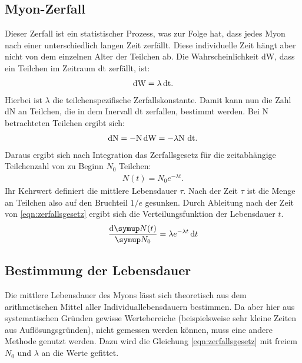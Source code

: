 \subsection{Myon-Zerfall}

Dieser Zerfall ist ein statistischer Prozess, was zur Folge hat, dass jedes Myon nach einer unterschiedlich langen Zeit zerfällt. Diese individuelle Zeit hängt aber nicht von dem einzelnen Alter der Teilchen ab.
Die Wahrscheinlichkeit dW, dass ein Teilchen im Zeitraum dt zerfällt, ist:
\begin{align}
  \mathop{}\!\mathrm{d} \text{W} = \lambda \mathop{}\!\mathrm{d} \text{t}.
\end{align}
Hierbei ist $\lambda$ die teilchenspezifische Zerfallskonstante.
Damit kann nun die Zahl dN an Teilchen, die in dem Inervall dt zerfallen, bestimmt werden. Bei N betrachteten Teilchen ergibt sich:
\begin{align}
  \mathop{}\!\mathrm{d} \text{N} = - \text{N} \mathop{}\!\mathrm{d} \text{W} = - \lambda \text{N dt}.
\end{align}
Daraus ergibt sich nach Integration das Zerfallsgesetz für
die zeitabhängige Teilchenzahl von zu Beginn $N_0$ Teilchen:
\begin{align}
  N(t) = N_0 e^{-\lambda t}. \label{eqn:zerfallsgesetz}
\end{align}
Ihr Kehrwert definiert die mittlere Lebensdauer $\tau$. Nach der Zeit $\tau$ ist die Menge an Teilchen also auf den Bruchteil $1/e$ gesunken.
Durch Ableitung nach der Zeit von \eqref{eqn:zerfallsgesetz} ergibt sich die Verteilungsfunktion der Lebensdauer $t$.
\begin{align}
  \frac{\dif \g{N}(t)}{\g{N}_0} = \lambda e^{-\lambda t} \dif t \label{eqn:expverteilung}
\end{align}

\subsection{Bestimmung der Lebensdauer}
\label{sec:Lebensdauerbestimmung}
Die mittlere Lebensdauer des Myons lässt sich theoretisch aus dem arithmetischen Mittel aller Individuallebensdauern bestimmen. Da aber hier aus systematischen Gründen gewisse Wertebereiche (beispielsweise sehr kleine Zeiten aus Auflösungsgründen), nicht gemessen werden können, muss eine andere Methode genutzt werden. Dazu wird die Gleichung \eqref{eqn:zerfallsgesetz} mit freiem $N_0$ und $\lambda$ an die Werte gefittet.


